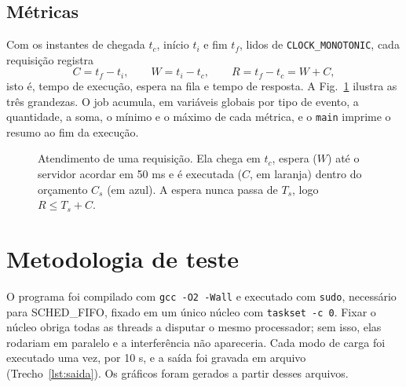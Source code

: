 \documentclass[conference,a4paper]{IEEEtran}
\begin{document}
\subsection{Métricas}
Com os instantes de chegada $t_c$, início $t_i$ e fim $t_f$, lidos de \texttt{CLOCK\_MONOTONIC}, cada requisição registra
\begin{equation}
C=t_f-t_i,\qquad W=t_i-t_c,\qquad R=t_f-t_c=W+C,
\end{equation}
isto é, tempo de execução, espera na fila e tempo de resposta. A Fig.~\ref{fig:tempo} ilustra as três grandezas. O job acumula, em variáveis globais por tipo de evento, a quantidade, a soma, o mínimo e o máximo de cada métrica, e o \texttt{main} imprime o resumo ao fim da execução.

\begin{figure}[!t]
\centering
{}
\caption{Atendimento de uma requisição. Ela chega em $t_c$, espera ($W$) até o servidor acordar em 50 ms e é executada ($C$, em laranja) dentro do orçamento $C_s$ (em azul). A espera nunca passa de $T_s$, logo $R\le T_s+C$.}
\label{fig:tempo}
\end{figure}

\section{Metodologia de teste}
O programa foi compilado com \texttt{gcc -O2 -Wall} e executado com \texttt{sudo}, necessário para SCHED\_FIFO, fixado em um único núcleo com \texttt{taskset -c 0}. Fixar o núcleo obriga todas as threads a disputar o mesmo processador; sem isso, elas rodariam em paralelo e a interferência não apareceria. Cada modo de carga foi executado uma vez, por 10 s, e a saída foi gravada em arquivo (Trecho~\ref{lst:saida}). Os gráficos foram gerados a partir desses arquivos.
\end{document}
